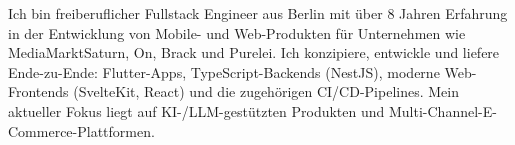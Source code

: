 \documentclass[10pt,a4paper,normalphoto]{altacv}
\begin{document}








\begin{fullwidth}
\makecvheader
\end{fullwidth}

\begin{fullwidth}
Ich bin freiberuflicher Fullstack Engineer aus Berlin mit über 8 Jahren Erfahrung in der Entwicklung von Mobile- und Web-Produkten für Unternehmen wie MediaMarktSaturn, On, Brack und Purelei. Ich konzipiere, entwickle und liefere Ende-zu-Ende: Flutter-Apps, TypeScript-Backends (NestJS), moderne Web-Frontends (SvelteKit, React) und die zugehörigen CI/CD-Pipelines. Mein aktueller Fokus liegt auf KI-/LLM-gestützten Produkten und Multi-Channel-E-Commerce-Plattformen.
\end{fullwidth}
\end{document}

